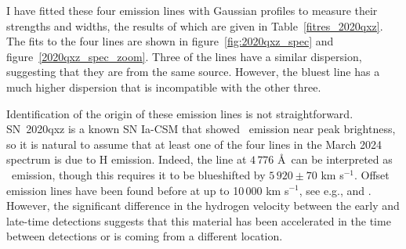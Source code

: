 \documentclass[a4paper,oneside,12pt, class=Latex/Classes/PhDthesisPSnPDF, crop=false]{standalone}
\begin{document}
I have fitted these four emission lines with Gaussian profiles to measure their strengths and widths, the results of which are given in Table~\ref{fitres_2020qxz}. The fits to the four lines are shown in figure~\ref{fig:2020qxz_spec} and figure~\ref{2020qxz_spec_zoom}. Three of the lines have a similar dispersion, suggesting that they are from the same source. However, the bluest line has a much higher dispersion that is incompatible with the other three.

Identification of the origin of these emission lines is not straightforward. SN~2020qxz is a known SN Ia-CSM that showed \Halpha\ emission near peak brightness, so it is natural to assume that at least one of the four lines in the March 2024 spectrum is due to H emission. Indeed, the line at $4\,776$ \AA~can be interpreted as \Hbeta\ emission, though this requires it to be blueshifted by $5\,920\pm70$ km s$^{-1}$. Offset emission lines have been found before at up to 10\,000 km s$^{-1}$, see e.g., \cite{2019bkc_Chen} and \cite{2019bkc_Prentice}. However, the significant difference in the hydrogen velocity between the early and late-time detections suggests that this material has been accelerated in the time between detections or is coming from a different location.\\
\end{document}
